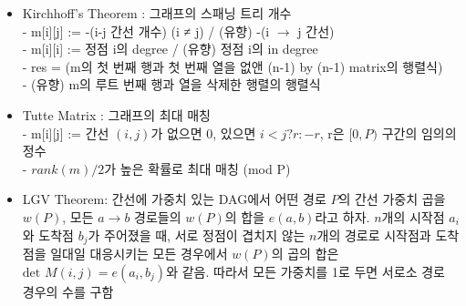 \begin{itemize}[noitemsep]
\item Kirchhoff’s Theorem : 그래프의 스패닝 트리 개수\\
- m[i][j] :=  -(i-j 간선 개수) (i ≠ j) / (유향) -(i $\rightarrow$ j 간선)\\
- m[i][i] :=  정점 i의 degree / (유향) 정점 i의 in degree\\
- res = (m의 첫 번째 행과 첫 번째 열을 없앤 (n-1) by (n-1) matrix의 행렬식)\\
- (유향) m의 루트 번째 행과 열을 삭제한 행렬의 행렬식

\item Tutte Matrix : 그래프의 최대 매칭\\
- m[i][j] := 간선 $(i, j)$가 없으면 0, 있으면 $i < j ? r : -r$, r은 $[0,P)$ 구간의 임의의 정수\\
- $rank(m) / 2$가 높은 확률로 최대 매칭 (mod P)

\item LGV Theorem: 간선에 가중치 있는 DAG에서 어떤 경로 $P$의 간선 가중치 곱을 $w(P)$, 모든 $a\rightarrow b$ 경로들의 $w(P)$의 합을 $e(a,b)$라고 하자. $n$개의 시작점 $a_i$와 도착점 $b_j$가 주어졌을 때, 서로 정점이 겹치지 않는 $n$개의 경로로 시작점과 도착점을 일대일 대응시키는 모든 경우에서 $w(P)$의 곱의 합은 $\text{det }M(i,j)=e(a_i,b_j)$와 같음. 따라서 모든 가중치를 1로 두면 서로소 경로 경우의 수를 구함
\end{itemize}